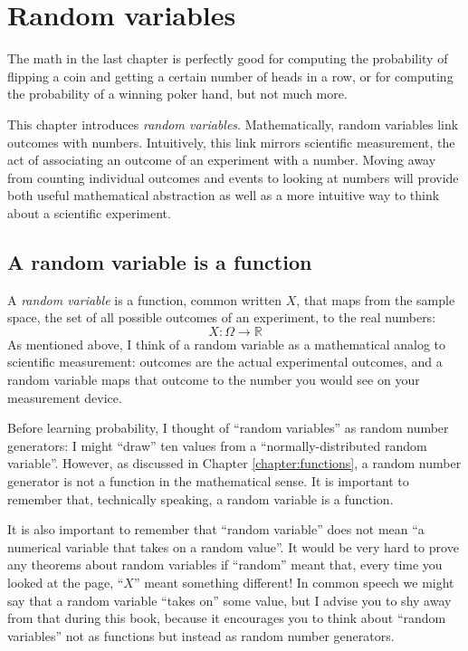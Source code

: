 
\chapter{Random variables}

The math in the last chapter is perfectly good for computing the probability
of flipping a coin and getting a certain number of heads in a row, or for
computing the probability of a winning poker hand, but not much more.

This chapter introduces \emph{random variables}. Mathematically, random
variables link outcomes with numbers. Intuitively, this link mirrors scientific
measurement, the act of associating an outcome of an experiment with a number.
Moving away from counting individual outcomes and events to looking at
numbers will provide both useful mathematical abstraction as well as a more
intuitive way to think about a scientific experiment.


\section{A random variable is a function}

A \emph{random variable} is a function, common written $X$, that maps from the
sample space, the set of all possible outcomes of an experiment, to the real numbers:
\begin{equation*}
    X : \Omega \to \mathbb{R}
\end{equation*}
As mentioned above, I
think of a random variable as a mathematical analog to scientific measurement:
outcomes are the actual experimental outcomes, and a random variable maps that
outcome to the number you would see on your measurement device.

Before learning probability, I thought of ``random variables'' as
random number generators: I might ``draw'' ten values from a
``normally-distributed random variable''. However, as discussed in Chapter
\ref{chapter:functions}, a random number generator is not a function in the
mathematical sense. It is important to remember that, technically speaking,
a random variable is a function.

It is also important to remember that ``random variable'' does not mean ``a
numerical variable that takes on a random value''. It would be very hard to
prove any theorems about random variables if ``random'' meant that, every time
you looked at the page, ``$X$'' meant something different! In common speech
we might say that a random variable ``takes on'' some value, but I advise you
to shy away from that during this book, because it encourages you to think
about ``random variables'' not as functions but instead as random number
generators.

